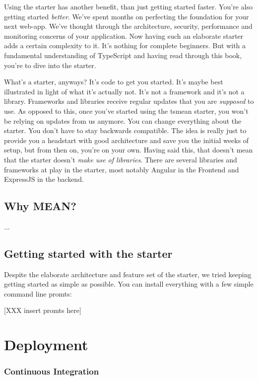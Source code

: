 \documentclass[12pt,a4paper]{report}
\begin{document}
Using the starter has another benefit, than just getting started faster. You're also getting started \textit{better}. We've spent months on perfecting the foundation for your next web-app. We've thought through the architecture, security, performance and monitoring concerns of your application. Now having such an elaborate starter adds a certain complexity to it. It's nothing for complete beginners. But with a fundamental understanding of TypeScript and having read through this book, you're to dive into the starter.

What's a starter, anyways? It's code to get you started. It's maybe best illustrated in light of what it's actually not. It's not a framework and it's not a library. Frameworks and libraries receive regular updates that you are \textit{supposed} to use. As opposed to this, once you've started using the tsmean starter, you won't be relying on updates from us anymore. You can change everything about the starter. You don't have to stay backwards compatible. The idea is really just to provide you a headstart with good architecture and save you the initial weeks of setup, but from then on, you're on your own. Having said this, that doesn't mean that the starter doesn't \textit{make use of libraries}. There are several libraries and frameworks at play in the starter, most notably Angular in the Frontend and ExpressJS in the backend.

\section{Why MEAN?}
...

\section {Getting started with the starter}
Despite the elaborate architecture and feature set of the starter, we tried keeping getting started as simple as possible. You can install everything with a few simple command line promts:

[XXX insert promts here]

\chapter{Deployment}

\subsection{Continuous Integration}
\end{document}
